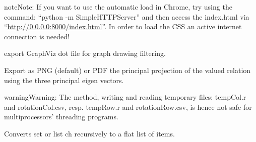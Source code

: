 \documentclass[letterpaper,10pt,english]{sphinxmanual}
\begin{document}
\begin{fulllineitems}
\begin{fulllineitems}
\begin{description}
\begin{enumerate}
\end{enumerate}

\end{description}

\begin{notice}{note}{Note:}
If you want to use the automatic load in Chrome, try using the command: ``python -m SimpleHTTPServer'' and then access the index.html via ``\href{http://0.0.0.0:8000/index.html}{http://0.0.0.0:8000/index.html}''.
In order to load the CSS an active internet connection is needed!
\end{notice}

\end{fulllineitems}


\begin{fulllineitems}
\label{techDoc:digraphs.Digraph.exportGraphViz}
export GraphViz dot file  for graph drawing filtering.

\end{fulllineitems}


\begin{fulllineitems}
\label{techDoc:digraphs.Digraph.exportPrincipalImage}
Export as PNG (default) or PDF the principal projection of
the valued relation using the three principal eigen vectors.

\begin{notice}{warning}{Warning:}
The method, writing and reading temporary files: 
tempCol.r and rotationCol.csv, resp. tempRow.r and rotationRow.csv,
is hence not safe for multiprocessors' threading programs.
\end{notice}

\end{fulllineitems}


\begin{fulllineitems}
\label{techDoc:digraphs.Digraph.flatChoice}
Converts set or list ch recursively to a flat list of items.


\end{fulllineitems}
\end{fulllineitems}
\end{document}
